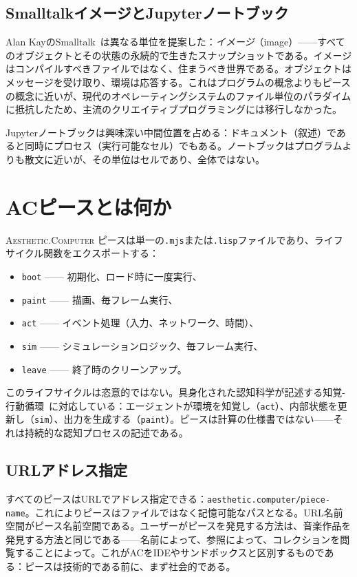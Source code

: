 \documentclass[10pt,letterpaper,twocolumn]{article}
\newcommand{\ac}{\textsc{Aesthetic.Computer}}
\begin{document}
\subsection{SmalltalkイメージとJupyterノートブック}

Alan KayのSmalltalk~\citep{kay1977personal}は異なる単位を提案した：\emph{イメージ}（image）——すべてのオブジェクトとその状態の永続的で生きたスナップショットである。イメージはコンパイルすべきファイルではなく、住まうべき世界である。オブジェクトはメッセージを受け取り、環境は応答する。これはプログラムの概念よりもピースの概念に近いが、現代のオペレーティングシステムのファイル単位のパラダイムに抵抗したため、主流のクリエイティブプログラミングには移行しなかった。

Jupyterノートブックは興味深い中間位置を占める：ドキュメント（叙述）であると同時にプロセス（実行可能なセル）でもある。ノートブックはプログラムよりも散文に近いが、その単位はセルであり、全体ではない。

\section{ACピースとは何か}

\ac{} ピースは単一の\texttt{.mjs}または\texttt{.lisp}ファイルであり、ライフサイクル関数をエクスポートする：

\begin{itemize}
  \item \texttt{boot} —— 初期化、ロード時に一度実行、
  \item \texttt{paint} —— 描画、毎フレーム実行、
  \item \texttt{act} —— イベント処理（入力、ネットワーク、時間）、
  \item \texttt{sim} —— シミュレーションロジック、毎フレーム実行、
  \item \texttt{leave} —— 終了時のクリーンアップ。
\end{itemize}

このライフサイクルは恣意的ではない。具身化された認知科学が記述する知覚-行動循環~\citep{varela1991embodied}に対応している：エージェントが環境を知覚し（\texttt{act}）、内部状態を更新し（\texttt{sim}）、出力を生成する（\texttt{paint}）。ピースは計算の仕様書ではない——それは持続的な認知プロセスの記述である。

\subsection{URLアドレス指定}

すべてのピースはURLでアドレス指定できる：\texttt{aesthetic.computer/piece-name}。これによりピースはファイルではなく記憶可能なパスとなる。URL名前空間がピース名前空間である。ユーザーがピースを発見する方法は、音楽作品を発見する方法と同じである——名前によって、参照によって、コレクションを閲覧することによって。これがACをIDEやサンドボックスと区別するものである：ピースは技術的である前に、まず社会的である。
\end{document}
